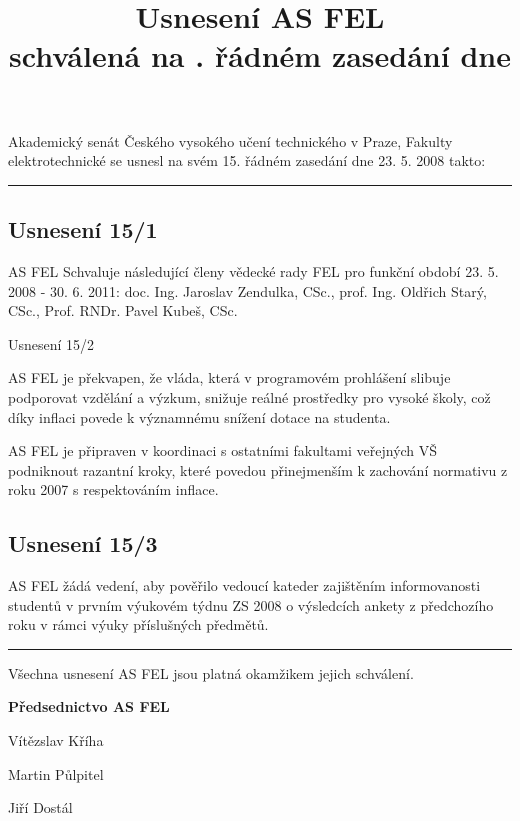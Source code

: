 \documentclass[a4paper,12pt,notitlepage]{article}
\title{Usnesení AS FEL\\schválená na \cislo. řádném zasedání dne \datum}
\author{}\date{}
\newcommand{\cislo}{15}
\newcommand{\datum}{23. 5. 2008 }
\newcommand{\hr}{\bigskip\hrule\bigskip}
\newcommand{\usneseni}[3]{
\subsection*{#1}

#2

}
\begin{document}
\maketitle
\thispagestyle{empty}


Akademický senát Českého vysokého učení technického v Praze, Fakulty
elektrotechnické se usnesl na svém \cislo. řádném zasedání dne \datum takto:\hr

\usneseni{Usnesení \cislo/1}{AS FEL Schvaluje následující členy vědecké rady FEL pro funkční období 23. 5. 2008 - 30. 6. 2011:
doc. Ing. Jaroslav Zendulka, CSc., prof. Ing. Oldřich Starý, CSc., Prof. RNDr. Pavel Kubeš, CSc.}

\usneseni{Usnesení \cislo/2}{AS FEL je překvapen, že vláda, která v programovém prohlášení slibuje podporovat vzdělání a výzkum, snižuje reálné prostředky pro vysoké školy, což díky inflaci povede k významnému snížení dotace na studenta.

AS FEL je připraven v koordinaci s ostatními fakultami veřejných VŠ podniknout razantní kroky, které povedou přinejmenším k zachování normativu z roku 2007 s respektováním inflace.}

\usneseni{Usnesení \cislo/3}{AS FEL žádá vedení, aby pověřilo vedoucí kateder zajištěním informovanosti studentů v prvním výukovém týdnu ZS 2008 o výsledcích ankety z předchozího roku v rámci výuky příslušných předmětů.}



\bigskip\hr
Všechna usnesení AS FEL jsou platná okamžikem jejich schválení.

\bigskip
\begin{center}
\textbf{Předsednictvo AS FEL}

Vítězslav Kříha

Martin Půlpitel

Jiří Dostál
\end{center}
\end{document}
